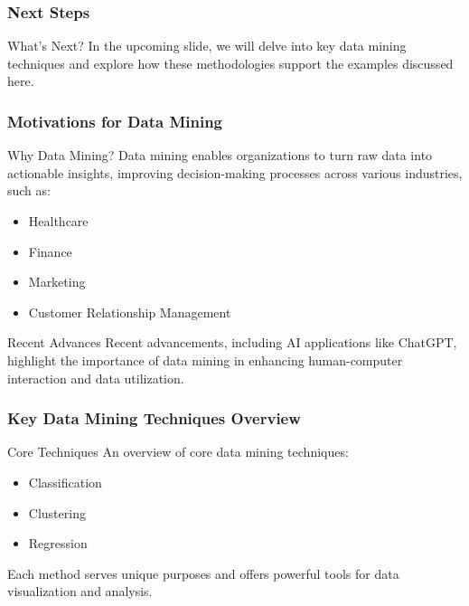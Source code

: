 \documentclass[aspectratio=169]{beamer}
\begin{document}
\begin{frame}[fragile]
    \frametitle{Next Steps}
    \begin{block}{What’s Next?}
        In the upcoming slide, we will delve into key data mining techniques and explore how these methodologies support the examples discussed here.
    \end{block}
\end{frame}

\begin{frame}[fragile]
    \frametitle{Motivations for Data Mining}
    \begin{block}{Why Data Mining?}
        Data mining enables organizations to turn raw data into actionable insights, improving decision-making processes across various industries, such as:
    \end{block}
    \begin{itemize}
        \item Healthcare
        \item Finance
        \item Marketing
        \item Customer Relationship Management
    \end{itemize}
    \begin{block}{Recent Advances}
        Recent advancements, including AI applications like ChatGPT, highlight the importance of data mining in enhancing human-computer interaction and data utilization.
    \end{block}
\end{frame}

\begin{frame}[fragile]
    \frametitle{Key Data Mining Techniques Overview}
    \begin{block}{Core Techniques}
        An overview of core data mining techniques:
    \end{block}
    \begin{itemize}
        \item Classification
        \item Clustering
        \item Regression
    \end{itemize}
    Each method serves unique purposes and offers powerful tools for data visualization and analysis.
\end{frame}
\end{document}
